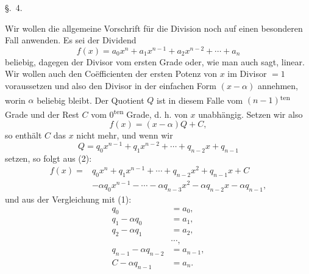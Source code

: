 
\begingroup
\setlength{\abovedisplayskip}{5pt plus 2pt minus 1pt}
\setlength{\belowdisplayskip}{5pt plus 2pt minus 1pt}
\setlength{\abovedisplayshortskip}{3pt plus 1pt}
\setlength{\belowdisplayshortskip}{4pt plus 1pt}
\linespread{0.94}\selectfont

\begin{center}
{\large \S.\ 4.}

\vspace{0.5em}
{\large{}}
\end{center}

Wir wollen die allgemeine Vorschrift für die Division noch auf einen
besonderen Fall anwenden. Es sei der Dividend
\begin{equation}
 f(x)=a_0x^n+a_1x^{n-1}+a_2x^{n-2}+\cdots+a_n
\tag{1}
\end{equation}
beliebig, dagegen der Divisor vom ersten Grade oder, wie man auch sagt,
linear. Wir wollen auch den Coëfficienten der ersten Potenz von $x$ im
Divisor $=1$ voraussetzen und also den Divisor in der einfachen Form
$(x-\alpha)$ annehmen, worin $\alpha$ beliebig bleibt. Der Quotient
$Q$ ist in diesem Falle vom $(n-1)$\textsuperscript{ten} Grade und der
Rest $C$ vom $0$\textsuperscript{ten} Grade, d. h. von $x$ unabhängig.
Setzen wir also
\begin{equation}
 f(x)=(x-\alpha)Q+C,
\tag{2}
\end{equation}
so enthält $C$ das $x$ nicht mehr, und wenn wir
\begin{equation}
 Q=q_0x^{n-1}+q_1x^{n-2}+\cdots+q_{n-2}x+q_{n-1}
\tag{3}
\end{equation}
setzen, so folgt aus (2):
\begin{equation}
\begin{aligned}
 f(x)={}&q_0x^n+q_1x^{n-1}+\cdots+q_{n-2}x^2+q_{n-1}x+C\\
 &-\alpha q_0x^{n-1}-\cdots-\alpha q_{n-3}x^2
   -\alpha q_{n-2}x-\alpha q_{n-1},
\end{aligned}
\tag{4}
\end{equation}
und aus der Vergleichung mit (1):
\begin{equation}
\begin{aligned}
 q_0&=a_0,\\
 q_1-\alpha q_0&=a_1,\\
 q_2-\alpha q_1&=a_2,\\
 &\cdots,\\
 q_{n-1}-\alpha q_{n-2}&=a_{n-1},\\
 C-\alpha q_{n-1}&=a_n.
\end{aligned}
\tag{5}
\end{equation}
